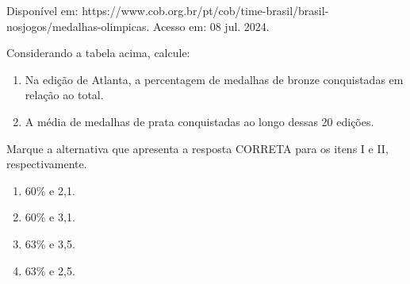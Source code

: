 \noindent Disponível em: https://www.cob.org.br/pt/cob/time-brasil/brasil-nosjogos/medalhas-olimpicas. Acesso em: 08 jul. 2024.

\par

Considerando a tabela acima, calcule:

\begin{enumerate}
\item[I.] Na edição de Atlanta, a percentagem de medalhas de bronze conquistadas em relação ao total.
\item[II.] A média de medalhas de prata conquistadas ao longo dessas 20 edições.
\end{enumerate}

Marque a alternativa que apresenta a resposta CORRETA para os itens I e II, respectivamente.
\begin{enumerate}
\item 60\% e 2,1.
\item 60\% e 3,1.
\item 63\% e 3,5.
\item 63\% e 2,5.
\end{enumerate}
